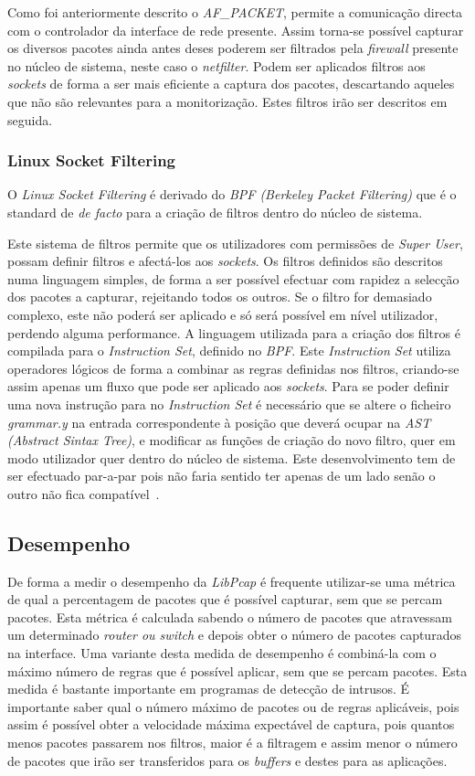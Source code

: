 Como foi anteriormente descrito o \textit{AF\_PACKET}, permite a comunicação directa com o controlador da interface de rede presente.
 Assim torna-se possível capturar os diversos pacotes ainda antes deses poderem ser filtrados pela \textit{firewall} presente no núcleo de sistema, neste caso o \textit{netfilter}.
Podem ser aplicados filtros aos \textit{sockets} de forma a ser mais eficiente a captura dos pacotes, descartando aqueles que não são relevantes para a monitorização. 
 Estes filtros irão ser descritos em seguida.


\subsubsection{Linux Socket Filtering}
O \textit{Linux Socket Filtering} é derivado do \textit{BPF (Berkeley Packet Filtering)} que é o standard de \textit{de facto} para a criação de filtros dentro do núcleo de sistema. 

Este sistema de filtros permite que os utilizadores com permissões de \textit{Super User}, possam definir filtros e afectá-los aos \textit{sockets}.
Os filtros definidos são descritos numa linguagem simples, de forma a ser possível efectuar com rapidez a selecção dos pacotes a capturar, rejeitando todos os outros.
Se o filtro for demasiado complexo, este não poderá ser aplicado e só será possível em nível utilizador, perdendo alguma performance.
A linguagem utilizada para a criação dos filtros é compilada para o \textit{Instruction Set}, definido no \textit{BPF}.
Este \textit{Instruction Set} utiliza operadores lógicos de forma a combinar as regras definidas nos filtros, criando-se assim apenas um fluxo que pode ser aplicado aos \textit{sockets}.
Para se poder definir uma nova instrução para no \textit{Instruction Set} é necessário que se altere o ficheiro \textit{grammar.y} na entrada correspondente à posição que deverá ocupar na \textit{AST (Abstract Sintax Tree)}, e modificar as funções de criação do novo filtro, quer em modo utilizador quer dentro do núcleo de sistema. Este desenvolvimento tem de ser efectuado par-a-par pois não faria sentido ter apenas de um lado senão o outro não fica compatível~\cite{Mccanne92thebsd}.

\subsection{Desempenho}
De forma a medir o desempenho da \textit{LibPcap} é frequente utilizar-se uma métrica de qual a percentagem de pacotes que é possível capturar, sem que se percam pacotes.
Esta métrica é calculada sabendo o número de pacotes que atravessam um determinado \textit{router ou switch} e depois obter o número de pacotes capturados na interface.
Uma variante desta medida de desempenho é combiná-la com o máximo número de regras que é possível aplicar, sem que se percam pacotes.
Esta medida é bastante importante em programas de detecção de intrusos.
É importante saber qual o número máximo de pacotes ou de regras aplicáveis, pois assim é possível obter a velocidade máxima expectável de captura, pois quantos menos pacotes passarem nos filtros, maior é a filtragem e assim menor o número de pacotes que irão ser transferidos para os \textit{buffers} e destes para as aplicações.

